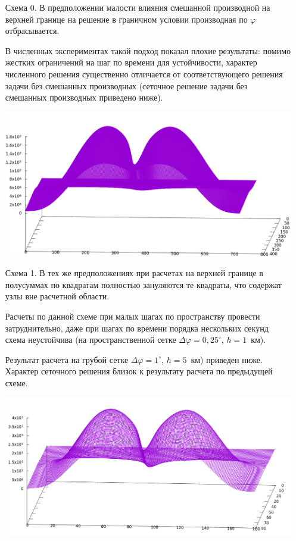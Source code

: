 \documentclass[2pt, a4paper, fleqn]{extarticle}
\begin{document}
\begin{itemize}

\item[Схема 0.] В предположении малости влияния смешанной производной на верхней границе на решение в граничном условии производная по $\varphi$ отбрасывается.

В численных экспериментах такой подход показал плохие результаты: помимо жестких ограничений на шаг по времени для устойчивости, характер численного решения существенно отличается от соответствующего решения задачи без смешанных производных (сеточное решение задачи без смешанных производных приведено ниже).

\includegraphics[scale=0.3]{scheme0.png}

\item[Схема 1.] В тех же предположениях при расчетах на верхней границе в полусуммах по квадратам полностью зануляются те квадраты, что содержат узлы вне расчетной области.

Расчеты по данной схеме при малых шагах по пространству провести затруднительно, даже при шагах по времени порядка нескольких секунд схема неустойчива (на пространственной сетке $\Delta\varphi = 0{,}25^\circ$, $h = 1$~км).

Результат расчета на грубой сетке $\Delta\varphi = 1^\circ$, $h = 5$~км) приведен ниже. Характер сеточного решения близок к результату расчета по предыдущей схеме.

\includegraphics[scale=0.3]{scheme1.png}


\end{itemize}
\end{document}
